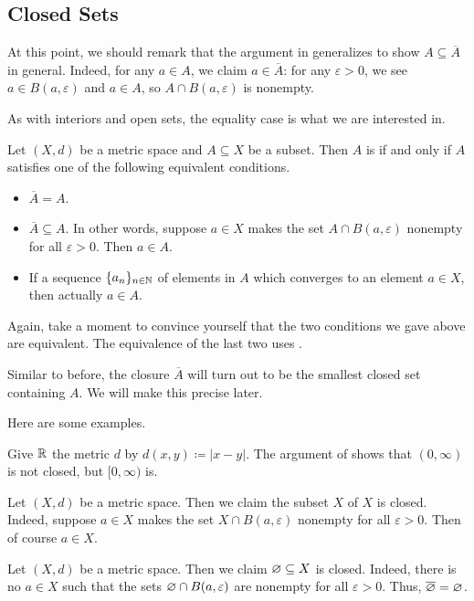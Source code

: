 \documentclass[../main.tex]{subfiles}
\begin{document}
\subsection{Closed Sets}
At this point, we should remark that the argument in  generalizes to show $A\subseteq\overline A$ in general. Indeed, for any $a\in A$, we claim $a\in\overline A$: for any $\varepsilon>0$, we see $a\in B(a,\varepsilon)$ and $a\in A$, so $A\cap B(a,\varepsilon)$ is nonempty.

As with interiors and open sets, the equality case is what we are interested in.
\begin{definition} \label{defi:closed}
    Let $(X,d)$ be a metric space and $A\subseteq X$ be a subset. Then $A$ is  if and only if $A$ satisfies one of the following equivalent conditions.
    \begin{itemize}
        \item $\overline A=A$.
        \item $\overline A\subseteq A$. In other words, suppose $a\in X$ makes the set $A\cap B(a,\varepsilon)$ nonempty for all $\varepsilon>0$. Then $a\in A$.
        \item If a sequence $\{a_n\}_{n\in\mathbb N}$ of elements in $A$ which converges to an element $a\in X$, then actually $a\in A$.
    \end{itemize}
\end{definition}
Again, take a moment to convince yourself that the two conditions we gave above are equivalent. The equivalence of the last two uses .
\begin{remark} \label{rem:cl-is-smallest-closed}
    Similar to before, the closure $\overline A$ will turn out to be the smallest closed set containing $A$. We will make this precise later.
\end{remark}
Here are some examples.
\begin{example}
    Give $\mathbb R$ the metric $d$ by $d(x,y)\coloneqq|x-y|$. The argument of  shows that $(0,\infty)$ is not closed, but $[0,\infty)$ is.
\end{example}
\begin{example}
    Let $(X,d)$ be a metric space. Then we claim the subset $X$ of $X$ is closed. Indeed, suppose $a\in X$ makes the set $X\cap B(a,\varepsilon)$ nonempty for all $\varepsilon>0$. Then of course $a\in X$.
\end{example}
\begin{example}
    Let $(X,d)$ be a metric space. Then we claim $\varnothing\subseteq X$ is closed. Indeed, there is no $a\in X$ such that the sets $\varnothing\cap B(a,\varepsilon)$ are nonempty for all $\varepsilon>0$. Thus, $\overline{\varnothing}=\varnothing$.
\end{example}
\end{document}
